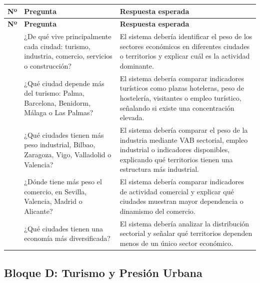 \begin{longtable}{>{\raggedright\arraybackslash}p{} >{\raggedright\arraybackslash}p{} >{\raggedright\arraybackslash}p{}}
\toprule
\textbf{Nº} & \textbf{Pregunta} & \textbf{Respuesta esperada} \\
\midrule
\endfirsthead
\toprule
\textbf{Nº} & \textbf{Pregunta} & \textbf{Respuesta esperada} \\
\midrule
\endhead
11 & ¿De qué vive principalmente cada ciudad: turismo, industria, comercio, servicios o construcción? & El sistema debería identificar el peso de los sectores económicos en diferentes ciudades o territorios y explicar cuál es la actividad dominante. \\
12 & ¿Qué ciudad depende más del turismo: Palma, Barcelona, Benidorm, Málaga o Las Palmas? & El sistema debería comparar indicadores turísticos como plazas hoteleras, peso de hostelería, visitantes o empleo turístico, señalando si existe una concentración elevada. \\
13 & ¿Qué ciudades tienen más peso industrial, Bilbao, Zaragoza, Vigo, Valladolid o Valencia? & El sistema debería comparar el peso de la industria mediante VAB sectorial, empleo industrial o indicadores disponibles, explicando qué territorios tienen una estructura más industrial. \\
14 & ¿Dónde tiene más peso el comercio, en Sevilla, Valencia, Madrid o Alicante? & El sistema debería comparar indicadores de actividad comercial y explicar qué ciudades muestran mayor dependencia o dinamismo del comercio. \\
15 & ¿Qué ciudades tienen una economía más diversificada? & El sistema debería analizar la distribución sectorial y señalar qué territorios dependen menos de un único sector económico. \\
\bottomrule
\end{longtable}

\subsection{Bloque D: Turismo y Presión Urbana}

